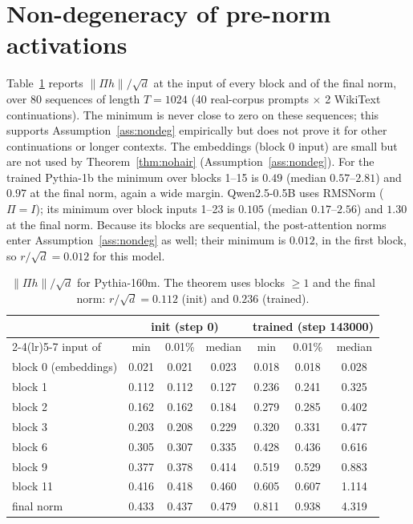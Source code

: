 \documentclass[11pt]{article}
\theoremstyle{definition}
\theoremstyle{remark}
\begin{document}
\section{Non-degeneracy of pre-norm activations}
\label{app:nondeg}
Table~\ref{tab:nondeg} reports $\|\Pi h\|/\sqrt d$ at the input of every block and of the final norm, over 80 sequences of length $T=1024$ (40 real-corpus prompts $\times$ 2 WikiText continuations). The minimum is never close to zero on these sequences; this supports Assumption~\ref{ass:nondeg} empirically but does not prove it for other continuations or longer contexts. The embeddings (block 0 input) are small but are not used by Theorem~\ref{thm:nohair} (Assumption~\ref{ass:nondeg}). For the trained Pythia-1b the minimum over blocks 1--15 is $0.49$ (median $0.57$--$2.81$) and $0.97$ at the final norm, again a wide margin. Qwen2.5-0.5B uses RMSNorm ($\Pi=I$); its minimum over block inputs 1--23 is $0.105$ (median $0.17$--$2.56$) and $1.30$ at the final norm. Because its blocks are sequential, the post-attention norms enter Assumption~\ref{ass:nondeg} as well; their minimum is $0.012$, in the first block, so $r/\sqrt d=0.012$ for this model.

\begin{table}[h]
\centering\small
\begin{tabular}{lcccccc}
\toprule
 & \multicolumn{3}{c}{init (step 0)} & \multicolumn{3}{c}{trained (step 143000)}\\
\cmidrule(lr){2-4}\cmidrule(lr){5-7}
input of & min & 0.01\% & median & min & 0.01\% & median \\
\midrule
block 0 (embeddings) & 0.021 & 0.021 & 0.023 & 0.018 & 0.018 & 0.028 \\
block 1  & 0.112 & 0.112 & 0.127 & 0.236 & 0.241 & 0.325 \\
block 2  & 0.162 & 0.162 & 0.184 & 0.279 & 0.285 & 0.402 \\
block 3  & 0.203 & 0.208 & 0.229 & 0.320 & 0.331 & 0.477 \\
block 6  & 0.305 & 0.307 & 0.335 & 0.428 & 0.436 & 0.616 \\
block 9  & 0.377 & 0.378 & 0.414 & 0.519 & 0.529 & 0.883 \\
block 11 & 0.416 & 0.418 & 0.460 & 0.605 & 0.607 & 1.114 \\
final norm & 0.433 & 0.437 & 0.479 & 0.811 & 0.938 & 4.319 \\
\bottomrule
\end{tabular}
\caption{$\|\Pi h\|/\sqrt d$ for Pythia-160m. The theorem uses blocks $\ge1$ and the final norm: $r/\sqrt d=0.112$ (init) and $0.236$ (trained).}
\label{tab:nondeg}
\end{table}
\end{document}
